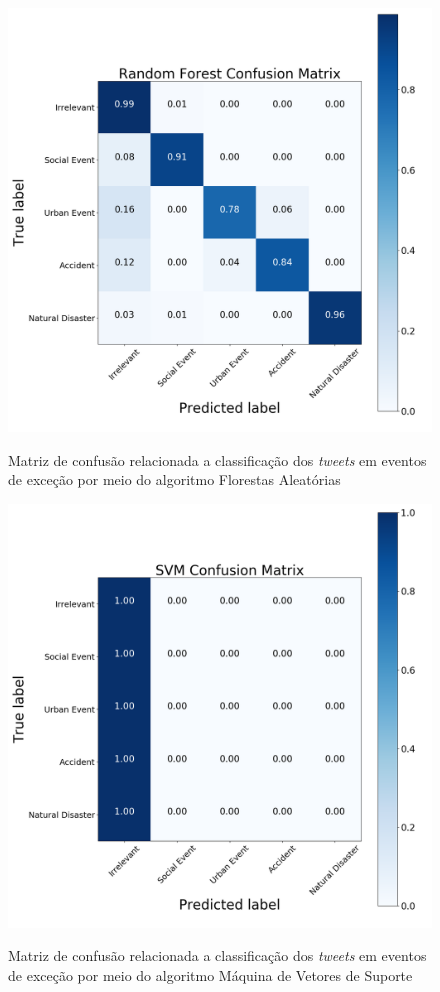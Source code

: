 \documentclass[
	12pt,				%
	oneside,			%
	a4paper,			%
	english,			%
	brazil				%
	]{abntex2ppgsi}
\begin{document}
\begin{apendicesenv}
\begin{figure}[!htb]
	\centering
 	  \caption{Matriz de confusão relacionada a classificação dos \textit{tweets} em eventos de exceção por meio do algoritmo Florestas Aleatórias}
		\includegraphics[width=1\linewidth]{images/confusion_matrix_rf.png}
	\label{fig:confusion_matrix_rf}
\end{figure}

\begin{figure}[!htb]
	\centering
 	  \caption{Matriz de confusão relacionada a classificação dos \textit{tweets} em eventos de exceção por meio do algoritmo Máquina de Vetores de Suporte}
		\includegraphics[width=1\linewidth]{images/confusion_matrix_svm.png}
	\label{fig:confusion_matrix_svm}
\end{figure}


\end{apendicesenv}
\end{document}
